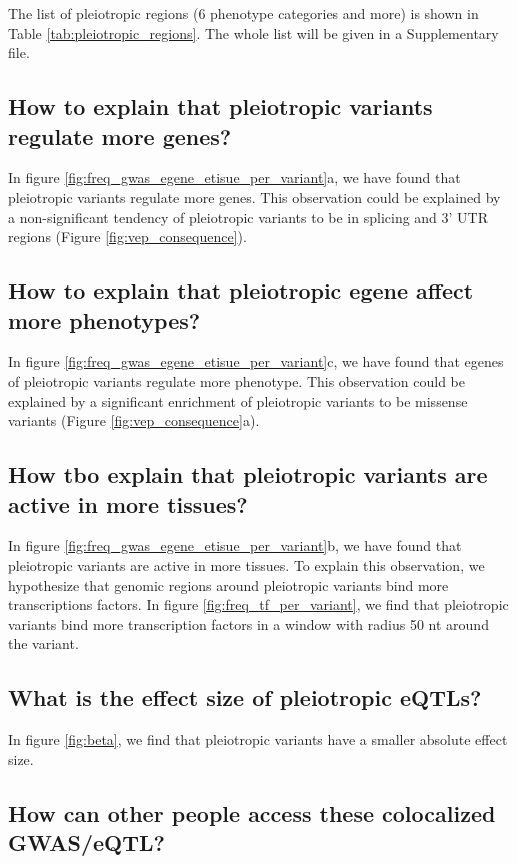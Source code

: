 The list of pleiotropic regions (6 phenotype categories and more) is shown in Table \ref{tab:pleiotropic_regions}. The whole list will be given in a Supplementary file.

\subsection*{How to explain that pleiotropic variants regulate more genes?}

In figure \ref{fig:freq_gwas_egene_etisue_per_variant}a, we have found that pleiotropic variants regulate more genes.
This observation could be explained by a non-significant tendency of pleiotropic variants to be in splicing and 3' UTR regions (Figure \ref{fig:vep_consequence}).

\subsection*{How to explain that pleiotropic egene affect more phenotypes?}

In figure \ref{fig:freq_gwas_egene_etisue_per_variant}c, we have found that egenes of pleiotropic variants regulate more phenotype.
This observation could be explained by a significant enrichment of pleiotropic variants to be missense variants (Figure \ref{fig:vep_consequence}a).

\subsection*{How tbo explain that pleiotropic variants are active in more tissues?}

In figure \ref{fig:freq_gwas_egene_etisue_per_variant}b, we have found that pleiotropic variants are active in more tissues.
To explain this observation, we hypothesize that genomic regions around pleiotropic variants bind more transcriptions factors.
In figure \ref{fig:freq_tf_per_variant}, we find that pleiotropic variants bind more transcription factors in a window with radius 50 nt around the variant.

\subsection*{What is the effect size of pleiotropic eQTLs?}

In figure \ref{fig:beta}, we find that pleiotropic variants have a smaller absolute effect size.

\subsection*{How can other people access these colocalized GWAS/eQTL?}

